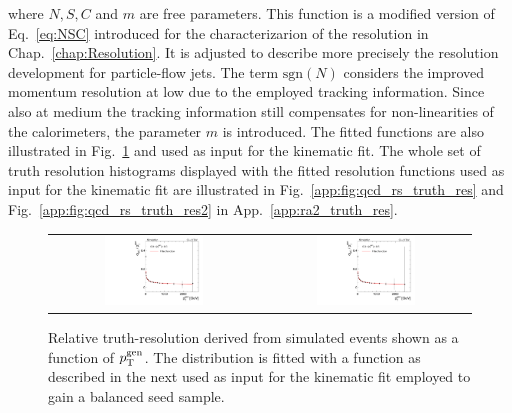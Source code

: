 \begin{description}
\begin{equation}
\end{equation} 
where $N, S, C$ and $m$ are free parameters. This function is a modified version of Eq.~\ref{eq:NSC} introduced for the characterizarion of the resolution in Chap.~\ref{chap:Resolution}. It is adjusted to describe more precisely the resolution development for particle-flow jets. The term $\mathrm{sgn}(N)$ considers the improved momentum resolution at low \pt due to the employed tracking information. Since also at medium \pt the tracking information still compensates for non-linearities of the calorimeters, the parameter $m$ is introduced. The fitted functions are also illustrated in Fig.~\ref{fig:qcd_rs_truth_res} and used as input for the kinematic fit. The whole set of truth resolution histograms displayed with the fitted resolution functions used as input for the kinematic fit are illustrated in Fig.~\ref{app:fig:qcd_rs_truth_res} and Fig.~\ref{app:fig:qcd_rs_truth_res2} in App.~\ref{app:ra2_truth_res}. 
\begin{figure}[!t]
  \centering
  \begin{tabular}{cc}
                \includegraphics[width=0.49\textwidth]{figures/TruthRes_Eta0.pdf} &
                \includegraphics[width=0.49\textwidth]{figures/TruthRes_Eta1.pdf} 
  \end{tabular}
  \caption{Relative truth-\pt resolution derived from simulated events shown as a function of $p_{\text{T}}^\mathrm{gen}$. The distribution is fitted with a function as described in the next used as input for the kinematic fit employed to gain a balanced seed sample.}
  \label{fig:qcd_rs_truth_res}
\end{figure}

\end{description}

